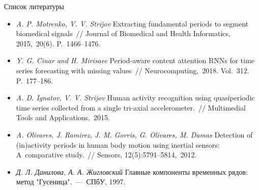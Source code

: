 \documentclass[10pt,pdf,hyperref={unicode}]{beamer}
\begin{document}
\begin{frame}{Список литературы}
	\begin{itemize}
	\justifying
		\item \textit{A. P. Motrenko, V. V. Strijov} Extracting fundamental periods to segment biomedical signals~// Journal of Biomedical and Health Informatics, 2015,~20(6). P.~1466--1476.
		
		\item \textit{Y. G. Cinar and H. Mirisaee} Period-aware content attention RNNs for time series forecasting with missing values~// Neurocomputing,~2018. Vol.~312. P.~177--186.
		
		\item	\textit{A. D. Ignatov, V. V. Strijov} Human activity recognition using quasiperiodic time series collected from a single tri-axial accelerometer.~// Multimedial Tools and Applications,~2015.
		
		\item \textit{A. Olivares, J. Ramirez, J. M. Gorris, G. Olivares, M. Damas} Detection of (in)activity periods in human body motion using inertial sensors: A~comparative study.~// Sensors, 12(5):5791--5814,~2012.
		
		\item \textit{Д. Л. Данилова, А. А. Жигловский} Главные компоненты временных рядов: метод "Гусеница".~---~СПбУ, 1997.
		
	\end{itemize}
\end{frame}
\end{document}
